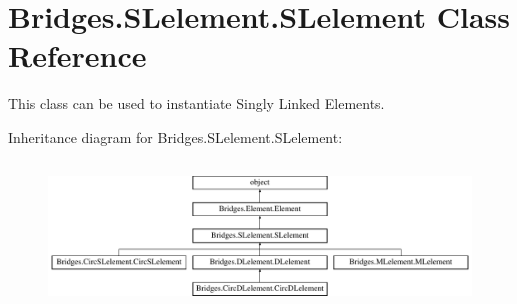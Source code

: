 \hypertarget{class_bridges_1_1_s_lelement_1_1_s_lelement}{}\section{Bridges.\+S\+Lelement.\+S\+Lelement Class Reference}
\label{class_bridges_1_1_s_lelement_1_1_s_lelement}


This class can be used to instantiate Singly Linked Elements.  


Inheritance diagram for Bridges.\+S\+Lelement.\+S\+Lelement\+:\begin{figure}[H]
\begin{center}
\leavevmode
\includegraphics[height=3.938116cm]{class_bridges_1_1_s_lelement_1_1_s_lelement}
\end{center}
\end{figure}
